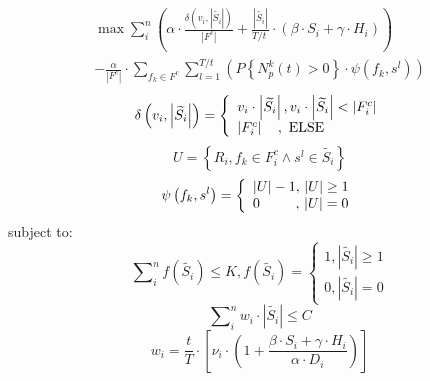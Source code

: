 \documentclass[conference,compsoc]{IEEEtran}
\begin{document}
\begin{equation}
\begin{split}
\max \sum\limits_{i}^{n}{(\alpha \cdot \frac{\delta ({{v}_{i}},\left| \widetilde{{{S}_{i}}} \right|)}{\left| {{F}^{c}} \right|}+\frac{\left| \widetilde{{{S}_{i}}} \right|}{{T}/{t}\;}\cdot (\beta \cdot {{S}_{i}}+\gamma \cdot {{H}_{i}}))}  \\
-\frac{\alpha }{\left| {{F}^{c}} \right|}\cdot \sum\limits_{{{f}_{k}}\in {{F}^{c}}}{\sum\limits_{l=1}^{{T}/{t}\;}{\left( P\left\{ N_{p}^{k}\left( t \right)>0 \right\}\cdot \psi \left( {{f}_{k}},{{s}^{l}} \right) \right)}}
\end{split}
\end{equation}
\begin{equation}
\delta \left( {{v_i},\left| {\widetilde {{S_i}}} \right|} \right) = \left\{ \begin{array}{l}
{v_i} \cdot \left| {\widetilde {{S_i}}} \right|,{\rm{    }}{v_i} \cdot \left| {\widetilde {{S_i}}} \right| < \left| {F_i^c} \right|\\
\left| {F_i^c} \right|{\rm{   }}\quad,\ {\rm{    ELSE}}
\end{array} \right.
\end{equation}
\begin{equation}
U = \left\{ {{R_i},{f_k} \in F_i^c \wedge {s^l} \in \widetilde {{S_i}}} \right\}
\end{equation}
\begin{equation}
\psi \left( {{f_k},{s^l}} \right) = \left\{ \begin{array}{l}
\left| U \right| - 1,{\rm{    }}\left| U \right| \ge 1\\
{\rm{   }}0\quad \quad \; \; ,\, \left| U \right| = 0
\end{array} \right.
\end{equation}
subject to:
\begin{equation}
\sum\nolimits_i^n {f(\widetilde {{S_i}}) \le } K,f(\widetilde {{S_i}}) = \left\{ \begin{array}{l}
1,\left| {\widetilde {{S_i}}} \right| \ge 1\\
0,\left| {\widetilde {{S_i}}} \right| = 0
\end{array} \right.
\end{equation}
 \begin{equation}
\sum\nolimits_{i}^{n}{{{w}_{i}}\cdot \left| \widetilde{{{S}_{i}}} \right|\le C}
\end{equation}
\begin{equation}
{{w}_{i}}=\frac{t}{T}\cdot [{{\nu }_{i}}\cdot (1+\frac{\beta \cdot {{S}_{i}}+\gamma \cdot {{H}_{i}}}{\alpha \cdot {{D}_{i}}})]
\end{equation}
 
\end{document}
